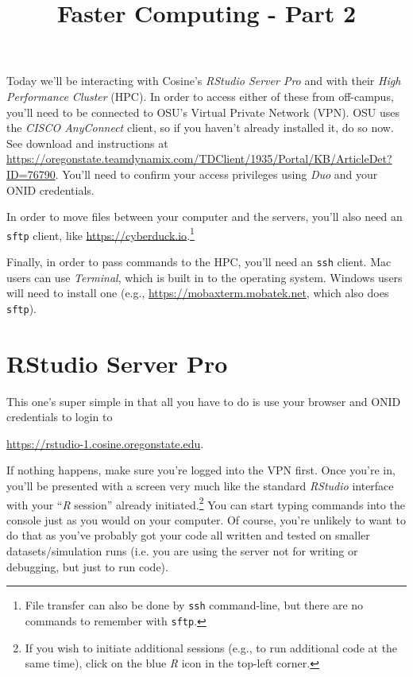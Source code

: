 \documentclass[12pt,letterpaper]{article}
\title{Faster Computing - Part 2}
\author{}
\begin{document}
\maketitle
\tableofcontents

\clearpage

Today we'll be interacting with Cosine's \emph{RStudio Server Pro} and with their \emph{High
Performance Cluster} (HPC).
In order to access either of these from off-campus, you'll need to be connected to OSU's Virtual Private
Network (VPN).
OSU uses the \emph{CISCO AnyConnect} client, so if you haven't already installed it, do so now.
See download and instructions at
\url{https://oregonstate.teamdynamix.com/TDClient/1935/Portal/KB/ArticleDet?ID=76790}.
You'll need to confirm your access privileges using \emph{Duo} and your ONID credentials.

In order to move files between your computer and the servers, you'll
also need an \texttt{sftp} client, like \url{https://cyberduck.io}.\footnote{File transfer can also be done by
\texttt{ssh} command-line, but there are no commands to remember with \texttt{sftp}.}

Finally, in order to pass commands to the HPC, you'll need an \texttt{ssh} client.
Mac users can use \emph{Terminal}, which is built in to the operating system.
Windows users will need to install one (e.g., \url{https://mobaxterm.mobatek.net}, which also does
\texttt{sftp}).



\section{RStudio Server Pro}

This one's super simple in that all you have to do is use your browser and ONID credentials to login
to

\url{https://rstudio-1.cosine.oregonstate.edu}.

\noindent
If nothing happens, make sure you're logged into the VPN first.
Once you're in, you'll be presented with a screen very much like the standard \emph{RStudio} interface
with your ``\emph{R} session'' already initiated.\footnote{If you wish to initiate additional sessions (e.g.,
to run additional code at the same time), click on the blue \emph{R} icon in the top-left corner.}
You can start typing commands into the console just as you would on your computer.
Of course, you're unlikely to want to do that as you've probably got your code all written and tested on
smaller datasets/simulation runs (i.e. you are using the server not for writing or debugging, but just to run code).
\end{document}
